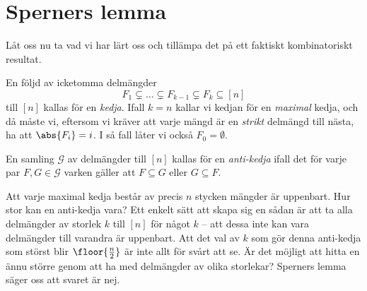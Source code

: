 \documentclass[nobib]{tufte-handout}
\begin{document}
\section{Sperners lemma}

Låt oss nu ta vad vi har lärt oss och tillämpa det på ett faktiskt kombinatoriskt resultat.

\begin{definition}
    En följd av icketomma delmängder
    $$F_1 \subsetneq \ldots \subsetneq F_{k-1} \subsetneq F_k \subseteq [n]$$
    till $[n]$ kallas för en \emph{kedja}. Ifall $k=n$ kallar vi kedjan för en \emph{maximal} kedja, och då måste vi, eftersom vi kräver att varje mängd är en \emph{strikt} delmängd till nästa, ha att $\abs{F_i} = i$. I så fall låter vi också $F_0 = \emptyset$.

    En samling $\mathcal{G}$ av delmängder till $[n]$ kallas för en \emph{anti-kedja} ifall det för varje par $F, G \in \mathcal{G}$ varken gäller att $F \subseteq G$ eller $G \subseteq F$.
\end{definition}

Att varje maximal kedja består av precis $n$ stycken mängder är uppenbart. Hur stor kan en anti-kedja vara? Ett enkelt sätt att skapa sig en sådan är att ta alla delmängder av storlek $k$ till $[n]$ för något $k$ -- att dessa inte kan vara delmängder till varandra är uppenbart. Att det val av $k$ som gör denna anti-kedja som störst blir $\floor{\frac{n}{2}}$ är inte allt för svårt att se. Är det möjligt att hitta en ännu större genom att ha med delmängder av olika storlekar? Sperners lemma säger oss att svaret är nej.
\end{document}
